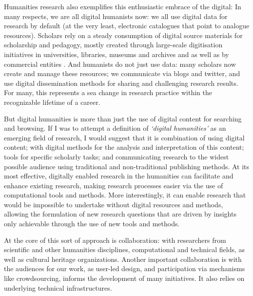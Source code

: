 \documentclass[amsthm,ebook]{saparticle}
\begin{document}
Humanities research also exemplifies this enthusiastic embrace of the digital: In many respects, we are all digital humanists now:  we all use digital data for research by default (at the very least, electronic catalogues that point to analogue resources). Scholars rely on a steady consumption of digital source materials for scholarship and pedagogy, mostly created through large-scale digitisation initiatives in universities, libraries, museums and archives and as well as by commercial entities \citep{Ell:2013aa}. And humanists do not just use data: many scholars now create and manage these resources; we communicate via blogs and twitter, and use digital dissemination methods for sharing and challenging research results.  For many, this represents a sea change in research practice within the recognizable lifetime of a career.

But digital humanities is more than just the use of digital content for searching and browsing. If I was to attempt a definition of \emph{`digital humanities'} as an emerging field of research, I would suggest that it is combination of using digital content; with digital methods for the analysis and interpretation of this content; tools for specific scholarly tasks; and communicating research to the widest possible audience using traditional and non-traditional publishing methods. At its most effective, digitally enabled research in the humanities can facilitate and enhance existing research, making research processes easier via the use of computational tools and methods. More interestingly, it can enable research that would be impossible to undertake without digital resources and methods, allowing the formulation of new research questions that are driven by insights only achievable through the use of new tools and methods.

At the core of this sort of approach is collaboration: with researchers from scientific and other humanities disciplines, computational and technical fields, as well as cultural heritage organizations. Another important collaboration is with the audiences for our work, as user-led design, and participation via mechanisms like crowdsourcing, informs the development of many initiatives. It also relies on underlying technical infrastructures.
\end{document}
